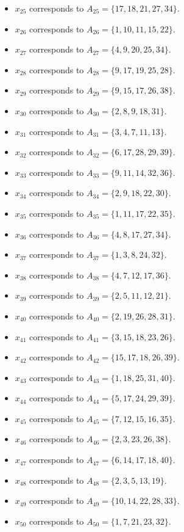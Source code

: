 \documentclass[11pt]{article}
\begin{document}
\begin{itemize}
\item $x_{25}$ corresponds to $A_{25}=\{17, 18, 21, 27, 34\}$.
\item $x_{26}$ corresponds to $A_{26}=\{1, 10, 11, 15, 22\}$.
\item $x_{27}$ corresponds to $A_{27}=\{4, 9, 20, 25, 34\}$.
\item $x_{28}$ corresponds to $A_{28}=\{9, 17, 19, 25, 28\}$.
\item $x_{29}$ corresponds to $A_{29}=\{9, 15, 17, 26, 38\}$.
\item $x_{30}$ corresponds to $A_{30}=\{2, 8, 9, 18, 31\}$.
\item $x_{31}$ corresponds to $A_{31}=\{3, 4, 7, 11, 13\}$.
\item $x_{32}$ corresponds to $A_{32}=\{6, 17, 28, 29, 39\}$.
\item $x_{33}$ corresponds to $A_{33}=\{9, 11, 14, 32, 36\}$.
\item $x_{34}$ corresponds to $A_{34}=\{2, 9, 18, 22, 30\}$.
\item $x_{35}$ corresponds to $A_{35}=\{1, 11, 17, 22, 35\}$.
\item $x_{36}$ corresponds to $A_{36}=\{4, 8, 17, 27, 34\}$.
\item $x_{37}$ corresponds to $A_{37}=\{1, 3, 8, 24, 32\}$.
\item $x_{38}$ corresponds to $A_{38}=\{4, 7, 12, 17, 36\}$.
\item $x_{39}$ corresponds to $A_{39}=\{2, 5, 11, 12, 21\}$.
\item $x_{40}$ corresponds to $A_{40}=\{2, 19, 26, 28, 31\}$.
\item $x_{41}$ corresponds to $A_{41}=\{3, 15, 18, 23, 26\}$.
\item $x_{42}$ corresponds to $A_{42}=\{15, 17, 18, 26, 39\}$.
\item $x_{43}$ corresponds to $A_{43}=\{1, 18, 25, 31, 40\}$.
\item $x_{44}$ corresponds to $A_{44}=\{5, 17, 24, 29, 39\}$.
\item $x_{45}$ corresponds to $A_{45}=\{7, 12, 15, 16, 35\}$.
\item $x_{46}$ corresponds to $A_{46}=\{2, 3, 23, 26, 38\}$.
\item $x_{47}$ corresponds to $A_{47}=\{6, 14, 17, 18, 40\}$.
\item $x_{48}$ corresponds to $A_{48}=\{2, 3, 5, 13, 19\}$.
\item $x_{49}$ corresponds to $A_{49}=\{10, 14, 22, 28, 33\}$.
\item $x_{50}$ corresponds to $A_{50}=\{1, 7, 21, 23, 32\}$.

\end{itemize}
\end{document}
